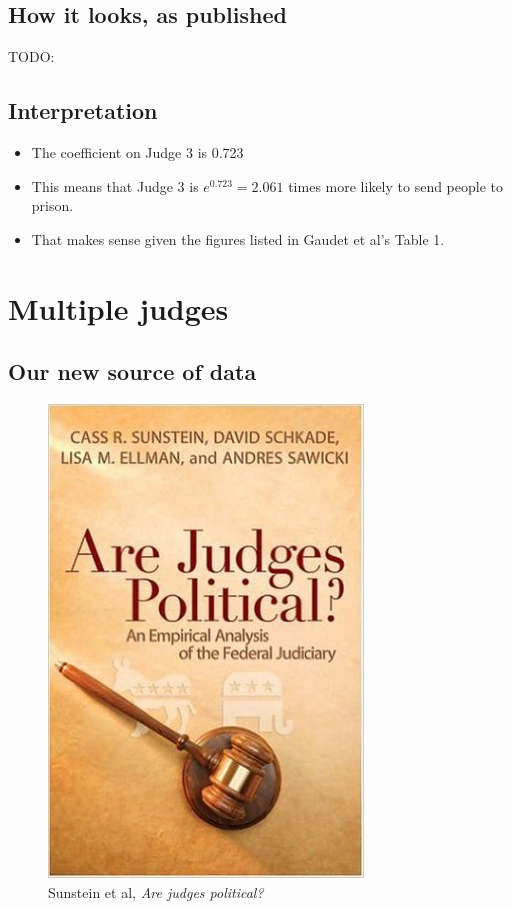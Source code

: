 \documentclass[12pt,twoside]{article}
\providecommand{\tightlist}{%
  \setlength{\itemsep}{0pt}\setlength{\parskip}{0pt}}
\begin{document}
\subsection{How it looks, as published}\label{how-it-looks-as-published}

TODO:

\subsection{Interpretation}\label{interpretation-3}

\begin{itemize}
\tightlist
\item
  The coefficient on Judge 3 is 0.723
\item
  This means that Judge 3 is \(e^{0.723} = 2.061\) times more likely to
  send people to prison.
\item
  That makes sense given the figures listed in Gaudet et al's Table 1.
\end{itemize}

\section{Multiple judges}\label{multiple-judges}

\subsection{Our new source of data}\label{our-new-source-of-data}

\begin{figure}[htbp]
\centering
\includegraphics{figure/sunstein_cover.jpg}
\caption{Sunstein et al, \emph{Are judges political?}}
\end{figure}
\end{document}
